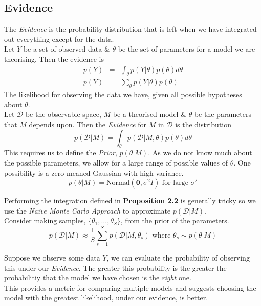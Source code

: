 \documentclass[11pt,a4paper]{article}
\begin{document}
\subsection{Evidence}

The \textit{Evidence} is the probability distribution that is left when we have integrated out everything except for the data.\\
Let $Y$ be a set of observed data \& $\theta$ be the set of parameters for a model we are theorising. Then the evidence is
\[\begin{array}{rcl}
p(Y)&=&\displaystyle\int_\theta p(Y|\theta)p(\theta)d\theta\\
p(Y)&=&\displaystyle\sum_\theta p(Y|\theta)p(\theta)
\end{array}\]
\nb The likelihood for observing the data we have, given all possible hypotheses about $\theta$.\\

Let $\mathcal{D}$ be the observable-space, $M$ be a theorised model \& $\theta$ be the parameters that $M$ depends upon. Then the \textit{Evidence} for $M$ in $\mathcal{D}$ is the distribution
$$p(\mathcal{D}|M)=\int_\theta p(\mathcal{D}|M,\theta)p(\theta)d\theta$$
This requires us to define the \textit{Prior}, $p(\theta|M)$. As we do not know much about the possible parameters, we allow for a large range of possible values of $\theta$. One possibility is a zero-meaned Gaussian with high variance.\\
$$p(\theta|M)=\text{Normal}(\textbf{0},\sigma^2I)\text{ for large }\sigma^2$$

Performing the integration defined in \textbf{Proposition 2.2} is generally tricky so we use the 
\textit{Na\"ive Monte Carlo Approach} to approximate $p(\mathcal{D}|M)$.\\
Consider making samples, $\{\theta_1,\dots,\theta_S\}$, from the prior of the parameters.
$$p(\mathcal{D}|M)\approx\frac{1}{S}\sum_{s=1}^Sp(\mathcal{D}|M,\theta_s)\text{ where }\theta_s\sim p(\theta|M)$$

Suppose we observe some data $Y$, we can evaluate the probability of observing this under our \textit{Evidence}. The greater this probability is the greater the probabilitiy that the model we have chosen is the \textit{right} one.\\
This provides a metric for comparing multiple models and suggests choosing the model with the greatest likelihood, under our evidence, is better.\\
\end{document}
